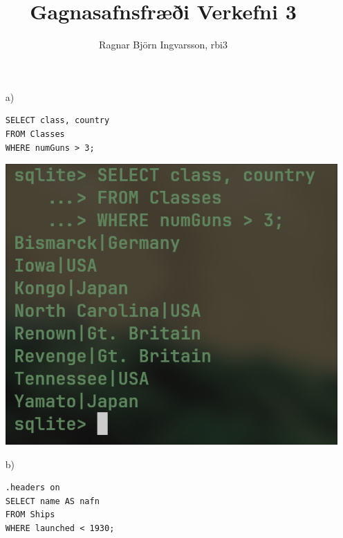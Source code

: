 \documentclass{article}
\title{Gagnasafnsfræði Verkefni 3}
\author{Ragnar Björn Ingvarsson, rbi3}
\begin{document}
\renewcommand\thepage{}
	
	\maketitle

	\newpage
	\setcounter{page}{1}
	\renewcommand\thepage{\arabic{page}}

	\section{}

	\begin{itemize}
		\item[a)] 
			\begin{verbatim}
SELECT class, country
FROM Classes
WHERE numGuns > 3;
			\end{verbatim}
			\begin{center}
				\includegraphics[scale=0.375]{numguns.png}
			\end{center}
		\item[b)] 
			\begin{verbatim}
.headers on
SELECT name AS nafn
FROM Ships
WHERE launched < 1930;
			\end{verbatim}
			\begin{center}

\end{center}
\end{itemize}
\end{document}
